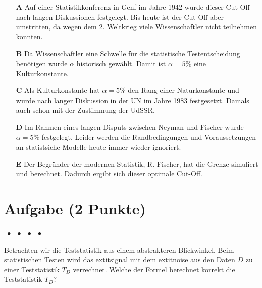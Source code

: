 \documentclass[a4paper, 9pt]{scrartcl}\usepackage[]{graphicx}\usepackage[]{xcolor}
\begin{document}
\begin{enumerate}
\item [\textbf{A} \msquare] Auf einer Statistikkonferenz in Genf im Jahre 1942 wurde dieser Cut-Off nach langen Diskussionen festgelegt. Bis heute ist der Cut Off aber umstritten, da wegen dem 2. Weltkrieg viele Wissenschaftler nicht teilnehmen konnten.
\item [\textbf{B} \msquare] Da Wissenschaftler eine Schwelle für die statistische Testentscheidung benötigen wurde $\alpha$ historisch gewählt. Damit ist $\alpha = 5\%$ eine Kulturkonstante.
\item [\textbf{C} \msquare] Als Kulturkonstante hat $\alpha = 5\%$ den Rang einer Naturkonstante und wurde nach langer Diskussion in der UN im Jahre 1983 festgesetzt. Damals auch schon mit der Zustimmung der UdSSR.
\item [\textbf{D} \msquare] Im Rahmen eines langen Disputs zwischen Neyman und Fischer wurde $\alpha = 5\%$ festgelegt. Leider werden die Randbedingungen und Voraussetzungen an statistsiche Modelle heute immer wieder ignoriert.
\item [\textbf{E} \msquare] Der Begründer der modernen Statistik, R. Fischer, hat die Grenze simuliert und berechnet. Dadurch ergibt sich dieser optimale Cut-Off.
\end{enumerate}

\section{Aufgabe \hfill (2 Punkte)}

\ifcollection
\begin{flushright}
\tiny\vspace{-2Ex}
\textbf{\examinhaltstart}
\exammodulemathstat $\;\bullet$
\exammodulestat $\;\bullet$
\exammodulestatbbv $\;\bullet$
\exammodulestatversuch $\;\bullet$
\exammodulebiostat
\vspace{-1Ex}
\end{flushright}
\fi




Betrachten wir die Teststatistik aus einem abstrakteren Blickwinkel. Beim statistischen Testen wird das 	extit{signal} mit dem 	extit{noise} aus den Daten $D$ zu einer Teststatistik $T_D$ verrechnet. Welche der Formel berechnet korrekt die Teststatistik $T_D$?
\end{document}
